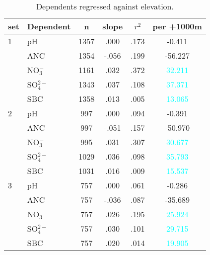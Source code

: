 \begin{table}[htbp]\scriptsize
\centering
\caption[Elevation trends]{Dependents regressed against elevation.}
\begin{tabular}{llcccc}
\toprule
set & Dependent & n & slope&$r^2$&per +1000m \\ 
\midrule
1   & pH               & 1357 & .000 & .173 & -0.411 \\ 
     & ANC            & 1354 & -.056 & .199 & -56.227  \\ 
     &  NO$_3^-$ & 1161 & .032 & .372 & \textcolor{cyan}{32.211}  \\ 
     &  SO$_4^{2-}$& 1343 & .037 & .108 & \textcolor{cyan}{37.371}  \\ 
     & SBC             & 1358 & .013 & .005 & \textcolor{cyan}{13.065} \\ 
\midrule
2   & pH               & 997 & .000 & .094 & -0.391  \\ 
     & ANC            & 997 & -.051 & .157 & -50.970 \\ 
     &  NO$_3^-$  & 995 & .031 & .307 & \textcolor{cyan}{30.677}  \\ 
     &  SO$_4^{2-}$ & 1029 & .036 & .098 & \textcolor{cyan}{35.793}  \\ 
     & SBC             & 1031 & .016 & .009 & \textcolor{cyan}{15.537} \\ 
 \midrule
3   & pH              & 757 & .000 & .061 & -0.286  \\ 
     & ANC           & 757 & -.036 & .087 & -35.689  \\ 
     &  NO$_3^-$ & 757 & .026 & .195 & \textcolor{cyan}{25.924}  \\ 
     &  SO$_4^{2-}$ & 757 & .030 & .101 & \textcolor{cyan}{29.715}  \\ 
     & SBC            & 757 & .020 & .014 & \textcolor{cyan}{19.905}  \\ 
 \bottomrule
\end{tabular}
\label{Water quality per elevation}
\end{table}
